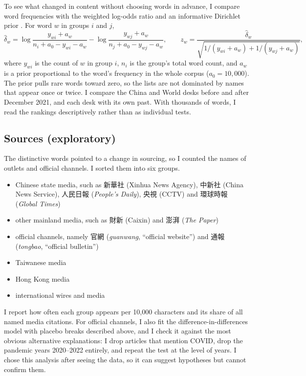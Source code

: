 \documentclass[11pt]{article}
\begin{document}
To see what changed in content without choosing words in advance, I compare word frequencies with the weighted log-odds ratio and an informative Dirichlet prior \cite{monroe}. For word $w$ in groups $i$ and $j$,
\[
\hat\delta_w = \log\frac{y_{wi} + a_w}{n_i + a_0 - y_{wi} - a_w} - \log\frac{y_{wj} + a_w}{n_j + a_0 - y_{wj} - a_w},
\qquad z_w = \frac{\hat\delta_w}{\sqrt{1/(y_{wi}+a_w) + 1/(y_{wj}+a_w)}},
\]
where $y_{wi}$ is the count of $w$ in group $i$, $n_i$ is the group's total word count, and $a_w$ is a prior proportional to the word's frequency in the whole corpus ($a_0 = 10{,}000$). The prior pulls rare words toward zero, so the lists are not dominated by names that appear once or twice. I compare the China and World desks before and after December 2021, and each desk with its own past. With thousands of words, I read the rankings descriptively rather than as individual tests.

\subsection{Sources (exploratory)}

The distinctive words pointed to a change in sourcing, so I counted the names of outlets and official channels. I sorted them into six groups.

\begin{itemize}
\item Chinese state media, such as 新華社 (Xinhua News Agency), 中新社 (China News Service), 人民日報 (\textit{People's Daily}), 央視 (CCTV) and 環球時報 (\textit{Global Times})
\item other mainland media, such as 財新 (Caixin) and 澎湃 (\textit{The Paper})
\item official channels, namely 官網 (\textit{guanwang}, ``official website'') and 通報 (\textit{tongbao}, ``official bulletin'')
\item Taiwanese media
\item Hong Kong media
\item international wires and media
\end{itemize}

\noindent I report how often each group appears per 10,000 characters and its share of all named media citations. For official channels, I also fit the difference-in-differences model with placebo breaks described above, and I check it against the most obvious alternative explanations: I drop articles that mention COVID, drop the pandemic years 2020--2022 entirely, and repeat the test at the level of years. I chose this analysis after seeing the data, so it can suggest hypotheses but cannot confirm them.
\end{document}

